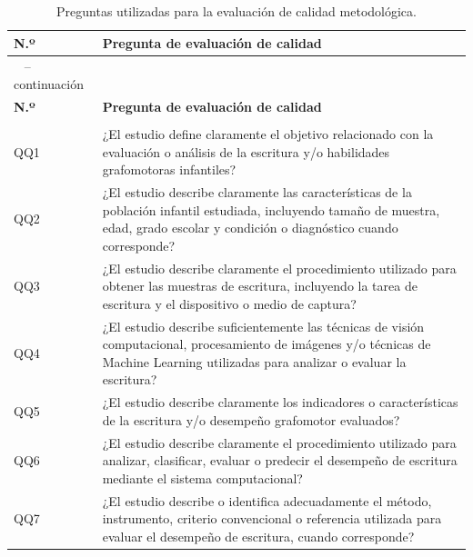 \documentclass{iaesarticle}
\begin{document}
\begin{longtable}{%
    |>{\centering\arraybackslash}p{}%
    |>{\raggedright\arraybackslash}p{}|}
\caption{Preguntas utilizadas para la evaluación de calidad metodológica.}
\label{tab:calidad}\\
\hline
\rowcolor{blue!10}
\textbf{N.º} & \textbf{Pregunta de evaluación de calidad} \\ 
\hline
\endfirsthead

\multicolumn{2}{c}%
{{\tablename\ \thetable{} -- continuación}} \\
\hline
\rowcolor{blue!10}
\textbf{N.º} & \textbf{Pregunta de evaluación de calidad} \\ 
\hline
\endhead

\hline
\multicolumn{2}{r}{Continúa en la siguiente página} \\
\endfoot

\hline
\endlastfoot

\scriptsize

QQ1 &
¿El estudio define claramente el objetivo relacionado con la evaluación o análisis de la escritura y/o habilidades grafomotoras infantiles? \\
\hline

QQ2 &
¿El estudio describe claramente las características de la población infantil estudiada, incluyendo tamaño de muestra, edad, grado escolar y condición o diagnóstico cuando corresponde? \\
\hline

QQ3 &
¿El estudio describe claramente el procedimiento utilizado para obtener las muestras de escritura, incluyendo la tarea de escritura y el dispositivo o medio de captura? \\
\hline

QQ4 &
¿El estudio describe suficientemente las técnicas de visión computacional, procesamiento de imágenes y/o técnicas de Machine Learning utilizadas para analizar o evaluar la escritura? \\
\hline

QQ5 &
¿El estudio describe claramente los indicadores o características de la escritura y/o desempeño grafomotor evaluados? \\
\hline

QQ6 &
¿El estudio describe claramente el procedimiento utilizado para analizar, clasificar, evaluar o predecir el desempeño de escritura mediante el sistema computacional? \\
\hline

QQ7 &
¿El estudio describe o identifica adecuadamente el método, instrumento, criterio convencional o referencia utilizada para evaluar el desempeño de escritura, cuando corresponde? \\
\hline


\end{longtable}
\end{document}
